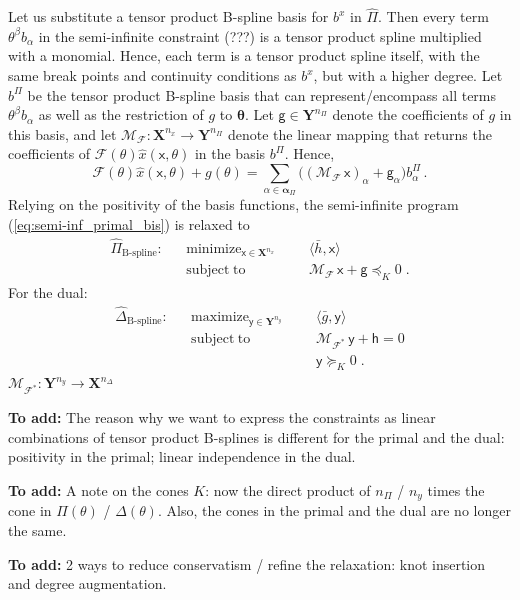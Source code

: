 \documentclass{article}
\DeclareMathOperator*{\minimize}{minimize}
\DeclareMathOperator*{\maximize}{maximize}
\DeclareMathOperator*{\subj}{subject\;to}
\newcommand{\adj}{\ast}                     %
\newcommand{\ppar}{\theta}                          %
\newcommand{\Ppar}{{\bm{\theta}}}                   %
\newcommand{\X}{\mathbf{X}}                         %
\newcommand{\Y}{\mathbf{Y}}                         %
\newcommand{\calF}{\mathcal{F}}                     %
\newcommand{\bx}{b^x}               %
\newcommand{\cx}{\textsf{x}}        %
\newcommand{\nx}{{n_x}}             %
\newcommand{\cy}{\textsf{y}}        %
\newcommand{\ny}{{n_y}}             %
\newcommand{\Alpha}{\bm{\alpha}}    %
\newcommand{\meanh}{\bar{h}}        %
\newcommand{\meang}{\bar{g}}        %
\newcommand{\bPi}{b^\Pi}                %
\newcommand{\bPia}{b^\Pi_\alpha}        %
\newcommand{\nPi}{{n_\Pi}}              %
\newcommand{\cg}{\textsf{g}}            %
\newcommand{\cga}{\textsf{g}_\alpha}    %
\newcommand{\nDelta}{{n_\Delta}}        %
\newcommand{\ch}{\textsf{h}}            %
\newcommand{\calMF}{\mathcal{M}_{\mathcal{F}}}
\newcommand{\calMFadj}{\mathcal{M}_{\mathcal{F}^\adj}}
\begin{document}
Let us substitute a tensor product B-spline basis for $\bx$ in $\hat{\Pi}$. Then every term $\ppar^\beta b_\alpha$ in the semi-infinite constraint (???) is a tensor product spline multiplied with a monomial. Hence, each term is a tensor product spline itself, with the same break points and continuity conditions as $\bx$, but with a higher degree. Let $\bPi$ be the tensor product B-spline basis that can represent/encompass all terms $\ppar^\beta b_\alpha$ as well as the restriction of $g$ to $\Ppar$. Let $\cg\in\Y^\nPi$ denote the coefficients of $g$ in this basis, and let $\calMF:\X^\nx \rightarrow \Y^\nPi$ denote the linear mapping that returns the coefficients of $\calF(\ppar)\hat{x}(\cx,\ppar)$ in the basis $\bPi$. Hence,
\[ \calF(\ppar)\hat{x}(\cx,\ppar) + g(\ppar) = \sum_{\alpha\in\Alpha_\Pi} \big( (\calMF \, \cx)_\alpha + \cga \big) \bPia \,. %
\]
Relying on the positivity of the basis functions, the semi-infinite program (\ref{eq:semi-inf_primal_bis}) is relaxed to
\[\begin{aligned}
\hat{\Pi}_{\text{B-spline}}: && \minimize_{\cx\in\X^\nx} &&& \langle \meanh, \cx \rangle  \\%
                             && \subj                    &&& \calMF \, \cx + \cg \preceq_K 0 \;.%
\end{aligned}\]
For the dual:
\[\begin{aligned}
\hat{\Delta}_{\text{B-spline}}: && \maximize_{\cy\in\Y^\ny} &&& \langle \meang, \cy \rangle \\%
                                && \subj                    &&& \calMFadj\,\cy + \ch = 0 \\%
                                &&                          &&& \cy \succeq_K 0     \;.%
\end{aligned}\]
$\calMFadj:\Y^\ny \rightarrow \X^\nDelta$

\noindent \textbf{To add:} The reason why we want to express the constraints as linear combinations of tensor product B-splines is different for the primal and the dual: positivity in the primal; linear independence in the dual.

\noindent \textbf{To add:} A note on the cones $K$: now the direct product of $\nPi$ / $\ny$ times the cone in $\Pi(\ppar)$ / $\Delta(\ppar)$. Also, the cones in the primal and the dual are no longer the same.

\noindent \textbf{To add:} 2 ways to reduce conservatism / refine the relaxation: knot insertion and degree augmentation.
\end{document}
